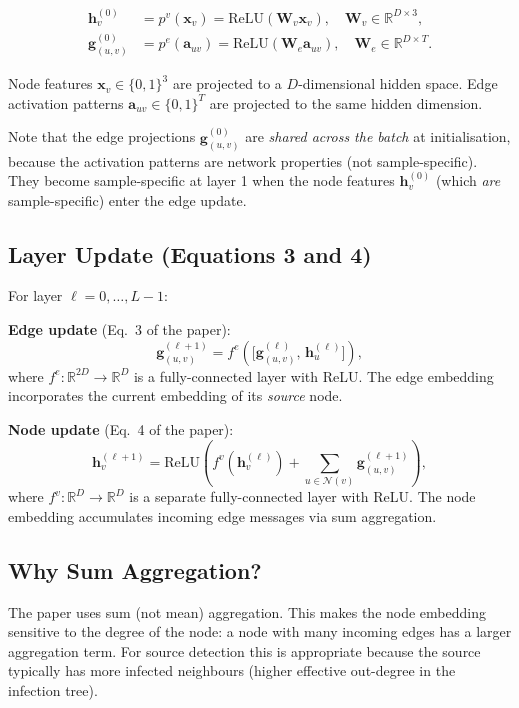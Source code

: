 \documentclass[12pt,a4paper]{report}
\newcommand{\R}{\mathbb{R}}
\newcommand{\bh}{\mathbf{h}}
\newcommand{\bx}{\mathbf{x}}
\newcommand{\bg}{\mathbf{g}}
\newcommand{\bW}{\mathbf{W}}
\newcommand{\calN}{\mathcal{N}}
\begin{document}
\begin{align}
  \bh_v^{(0)} &= p^v(\bx_v) = \text{ReLU}(\bW_v \bx_v), \quad \bW_v \in \R^{D \times 3},
  \label{eq:bn_init_node} \\
  \bg_{(u,v)}^{(0)} &= p^e(\mathbf{a}_{uv}) = \text{ReLU}(\bW_e \mathbf{a}_{uv}), \quad \bW_e \in \R^{D \times T}.
  \label{eq:bn_init_edge}
\end{align}

Node features $\bx_v \in \{0,1\}^3$ are projected to a $D$-dimensional hidden
space. Edge activation patterns $\mathbf{a}_{uv} \in \{0,1\}^T$ are projected
to the same hidden dimension.

Note that the edge projections $\bg_{(u,v)}^{(0)}$ are \emph{shared across the
batch} at initialisation, because the activation patterns are network properties
(not sample-specific). They become sample-specific at layer 1 when the node
features $\bh_v^{(0)}$ (which \emph{are} sample-specific) enter the edge update.

\subsection{Layer Update (Equations 3 and 4)}

For layer $\ell = 0, \ldots, L-1$:

\textbf{Edge update} (Eq.~3 of the paper):
\begin{equation}
  \bg_{(u,v)}^{(\ell+1)} = f^e\!\left(\bigl[\bg_{(u,v)}^{(\ell)},\, \bh_u^{(\ell)}\bigr]\right),
  \label{eq:bn_edge_update}
\end{equation}
where $f^e: \R^{2D} \to \R^D$ is a fully-connected layer with ReLU. The edge
embedding incorporates the current embedding of its \emph{source} node.

\textbf{Node update} (Eq.~4 of the paper):
\begin{equation}
  \bh_v^{(\ell+1)} = \text{ReLU}\!\left(f^v\!\left(\bh_v^{(\ell)}\right) + \sum_{u \in \calN(v)} \bg_{(u,v)}^{(\ell+1)}\right),
  \label{eq:bn_node_update}
\end{equation}
where $f^v: \R^D \to \R^D$ is a separate fully-connected layer with ReLU. The
node embedding accumulates incoming edge messages via sum aggregation.

\subsection{Why Sum Aggregation?}

The paper uses sum (not mean) aggregation. This makes the node embedding
sensitive to the degree of the node: a node with many incoming edges has a
larger aggregation term. For source detection this is appropriate because the
source typically has more infected neighbours (higher effective out-degree in
the infection tree).
\end{document}
